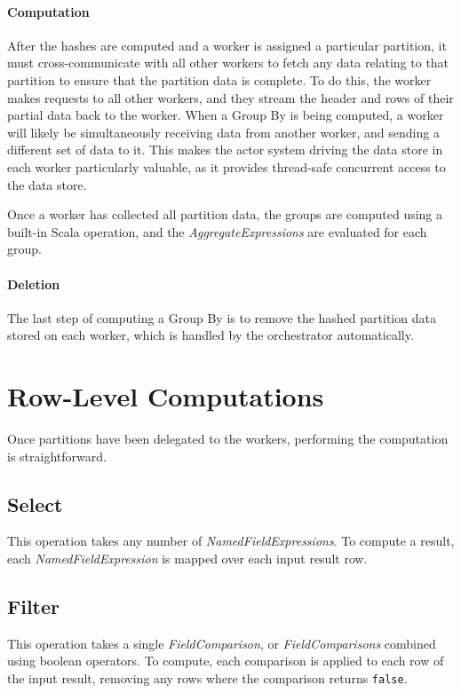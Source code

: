 \paragraph{Computation}
After the hashes are computed and a worker is assigned a particular partition, it must cross-communicate with all other workers to fetch any data relating to that partition to ensure that the partition data is complete. To do this, the worker makes requests to all other workers, and they stream the header and rows of their partial data back to the worker. When a Group By is being computed, a worker will likely be simultaneously receiving data from another worker, and sending a different set of data to it. This makes the actor system driving the data store in each worker particularly valuable, as it provides thread-safe concurrent access to the data store.

Once a worker has collected all partition data, the groups are computed using a built-in Scala operation, and the \textit{AggregateExpressions} are evaluated for each group.

\paragraph{Deletion}
The last step of computing a Group By is to remove the hashed partition data stored on each worker, which is handled by the orchestrator automatically.



\section{Row-Level Computations}
Once partitions have been delegated to the workers, performing the computation is straightforward. 

\subsection{Select}\label{subsec:select-computation}
This operation takes any number of \textit{NamedFieldExpressions}. To compute a result, each \textit{NamedFieldExpression} is mapped over each input result row. 

\subsection{Filter}\label{subsec:filter-computation}
This operation takes a single \textit{FieldComparison}, or \textit{FieldComparisons} combined using boolean operators. To compute, each comparison is applied to each row of the input result, removing any rows where the comparison returns \texttt{false}.



